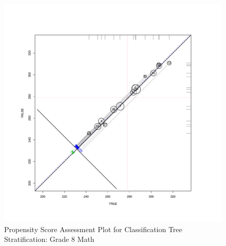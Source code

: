 \documentclass[letterpaper,12p,twoside]{article} %
\begin{document}
\clearpage
\begin{figure}
\begin{center}
\includegraphics[height=.4\textheight,width=.4\textheight]{../Figures2009/g8math-circpsa-tree.pdf}
\caption{Propensity Score Assessment Plot for Classification Tree Stratification: Grade 8 Math}
\end{center}
\end{figure}


\end{document}
